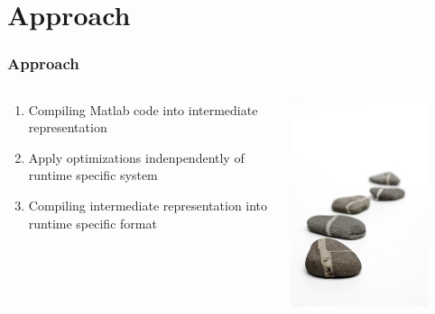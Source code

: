 \section{Approach}

\begin{frame}
	\frametitle{Approach}
	\begin{columns}
		\begin{column}{0.6\textwidth}
			\begin{enumerate}
				\item Compiling Matlab code into intermediate representation
				\item Apply optimizations indenpendently of runtime specific system
				\item Compiling intermediate representation into runtime specific format
			\end{enumerate}
		\end{column}
		\begin{column}{0.4\textwidth}
			\includegraphics[width=0.8\textwidth]{images/approach.jpg}
		\end{column}
	\end{columns}
\end{frame}

